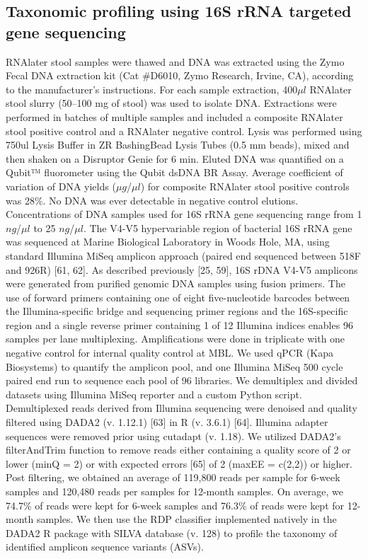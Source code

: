 \subsection{Taxonomic profiling using 16S rRNA targeted gene sequencing}
RNAlater stool samples were thawed and DNA was extracted using the Zymo Fecal DNA extraction kit (Cat \#D6010, Zymo Research, Irvine, CA), according to the manufacturer’s instructions. For each sample extraction, 400$\mu l$ RNAlater stool slurry (50–100 mg of stool) was used to isolate DNA. Extractions were performed in batches of multiple samples and included a composite RNAlater stool positive control and a RNAlater negative control. Lysis was performed using 750ul Lysis Buffer in ZR BashingBead\texttrademark{} Lysis Tubes (0.5 mm beads), mixed and then shaken on a Disruptor Genie for 6 min. Eluted DNA was quantified on a Qubit™ fluorometer using the Qubit\texttrademark{} dsDNA BR Assay. Average coefficient of variation of DNA yields ($\mu g$/$\mu l$) for composite RNAlater stool positive controls was 28\%. No DNA was ever detectable in negative control elutions.  Concentrations of DNA samples used for 16S rRNA gene sequencing range from 1 $ng$/$\mu l$ to 25 $ng$/$\mu l$.
The V4-V5 hypervariable region of bacterial 16S rRNA gene was sequenced at Marine Biological Laboratory in Woods Hole, MA, using standard Illumina MiSeq amplicon approach (paired end sequenced between 518F and 926R) [61, 62]. As described previously  [25, 59], 16S rDNA V4-V5 amplicons were generated from purified genomic DNA samples using fusion primers. The use of forward primers containing one of eight five-nucleotide barcodes between the Illumina-specific bridge and sequencing primer regions and the 16S-specific region and a single reverse primer containing 1 of 12 Illumina indices enables 96 samples per lane multiplexing. Amplifications were done in triplicate with one negative control for internal quality control at MBL. We used qPCR (Kapa Biosystems) to quantify the amplicon pool, and one Illumina MiSeq 500 cycle paired end run to sequence each pool of 96 libraries. We demultiplex and divided datasets using Illumina MiSeq reporter and a custom Python script.  Demultiplexed reads derived from Illumina sequencing were denoised and quality filtered using DADA2 (v. 1.12.1) [63] in R (v. 3.6.1) [64]. Illumina adapter sequences were removed prior using cutadapt (v. 1.18). We utilized DADA2’s filterAndTrim function to remove reads either containing a quality score of 2 or lower (minQ = 2) or with expected errors [65] of 2 (maxEE = c(2,2)) or higher. Post filtering, we obtained an average of 119,800 reads per sample for 6-week samples and 120,480 reads per samples for 12-month samples. On average, we 74.7\% of reads were kept for 6-week samples and 76.3\% of reads were kept for 12-month samples. We then use the RDP classifier implemented natively in the DADA2 R package with SILVA database (v. 128) to profile the taxonomy of identified amplicon sequence variants (ASVs). 
